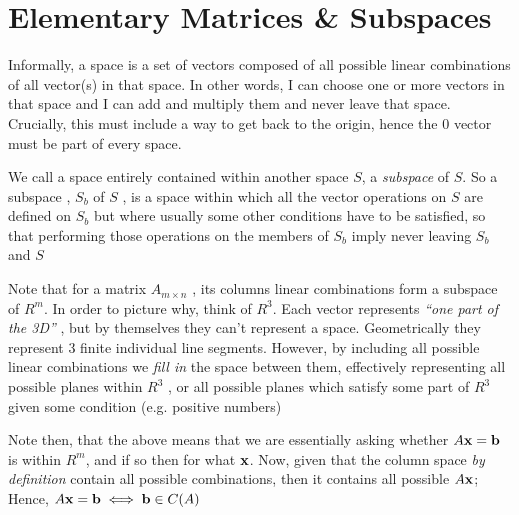 \documentclass[english,course]{Notes}
\newcommand{\ita}[1]{\textit{#1}}
\begin{document}
	      
	      
	      	\section{Elementary Matrices \& Subspaces}
	      	
	      	
	      	\par{Informally, a space is a set of vectors composed of all possible linear combinations of all vector(s) in that space. In other words, I can choose one or more vectors in that space and I can add and multiply them and never leave that space. Crucially, this must include a way to get back to the origin, hence the $0$ vector must be part of every space.}
	      	
	      	
	      	\par{We call a space entirely contained within another space $S$, a \ita{subspace} of $S$. So a subspace , $S_{b}$ of $S$ , is a space within which all the vector operations on $S$ are defined on $S_{b}$ but where usually some other conditions have to be satisfied, so that performing those operations on the members of $S_{b}$ imply never leaving $S_{b}$ and $S$ }
	      	
	      	\par{Note that for a matrix $A_{m \times n}$ , its columns linear combinations form a subspace of $R^{m}$. In order to picture why, think of $R^{3}$. Each vector represents \ita{``one part of the 3D''} , but by themselves they can't represent a space. Geometrically they represent 3 finite individual line segments. However, by including all possible linear combinations we \ita{fill in} the space between them, effectively representing all possible planes within $R^{3}$ , or all possible planes which satisfy some part of $R^{3}$ given some condition (e.g. positive numbers) }
	      	
	      	
	      	\par{Note then, that the above means that we are essentially asking whether $A\mathbf{x} = \mathbf{b}$ is within $R^{m}$, and if so then for what $\mathbf{x}$. Now, given that the column space \ita{by definition} contain all possible combinations, then it contains all possible $A\mathbf{x}$; Hence,  $A\mathbf{x} = \mathbf{b} \iff \mathbf{b} \in C(A)$ }
	      	
\end{document}
